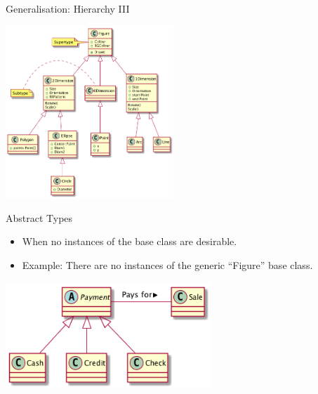 \documentclass[10pt,t,a4paper]{beamer}
\begin{document}
\begin{frame}[label={sec:org0a9ead5}]{Generalisation: Hierarchy III}
\begin{center}
\includegraphics[height=6.5cm]{FInheritance3.png}
\end{center}
\end{frame}

\begin{frame}[label={sec:org857167a}]{Abstract Types}
\begin{itemize}
\item When no instances of the base class are desirable.
\item Example: There are no instances of the generic ``Figure'' base class.
\end{itemize}
\begin{center}
\includegraphics[height=4cm]{FInheritanceAbstract.png}
\end{center}
\end{frame}
\end{document}
